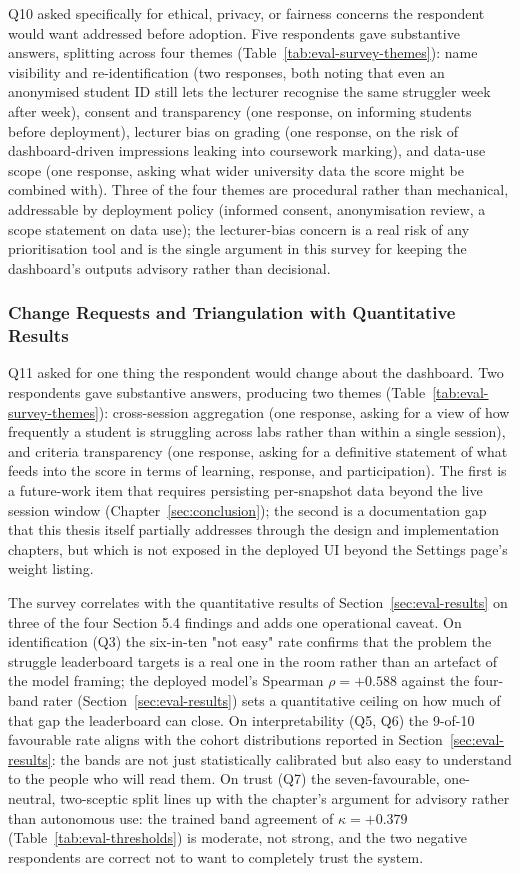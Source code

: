 Q10 asked specifically for ethical, privacy, or fairness concerns the respondent would want addressed before adoption. Five respondents gave substantive answers, splitting across four themes (Table~\ref{tab:eval-survey-themes}): name visibility and re-identification (two responses, both noting that even an anonymised student ID still lets the lecturer recognise the same struggler week after week), consent and transparency (one response, on informing students before deployment), lecturer bias on grading (one response, on the risk of dashboard-driven impressions leaking into coursework marking), and data-use scope (one response, asking what wider university data the score might be combined with). Three of the four themes are procedural rather than mechanical, addressable by deployment policy (informed consent, anonymisation review, a scope statement on data use); the lecturer-bias concern is a real risk of any prioritisation tool and is the single argument in this survey for keeping the dashboard's outputs advisory rather than decisional.

\subsubsection{Change Requests and Triangulation with Quantitative Results}
Q11 asked for one thing the respondent would change about the dashboard. Two respondents gave substantive answers, producing two themes (Table~\ref{tab:eval-survey-themes}): cross-session aggregation (one response, asking for a view of how frequently a student is struggling across labs rather than within a single session), and criteria transparency (one response, asking for a definitive statement of what feeds into the score in terms of learning, response, and participation). The first is a future-work item that requires persisting per-snapshot data beyond the live session window (Chapter~\ref{sec:conclusion}); the second is a documentation gap that this thesis itself partially addresses through the design and implementation chapters, but which is not exposed in the deployed UI beyond the Settings page's weight listing.

The survey correlates with the quantitative results of Section~\ref{sec:eval-results} on three of the four Section 5.4 findings and adds one operational caveat. On identification (Q3) the six-in-ten "not easy" rate confirms that the problem the struggle leaderboard targets is a real one in the room rather than an artefact of the model framing; the deployed model's Spearman $\rho = +0.588$ against the four-band rater (Section~\ref{sec:eval-results}) sets a quantitative ceiling on how much of that gap the leaderboard can close. On interpretability (Q5, Q6) the 9-of-10 favourable rate aligns with the cohort distributions reported in Section~\ref{sec:eval-results}: the bands are not just statistically calibrated but also easy to understand to the people who will read them. On trust (Q7) the seven-favourable, one-neutral, two-sceptic split lines up with the chapter's argument for advisory rather than autonomous use: the trained band agreement of $\kappa = +0.379$ (Table~\ref{tab:eval-thresholds}) is moderate, not strong, and the two negative respondents are correct not to want to completely trust the system.

